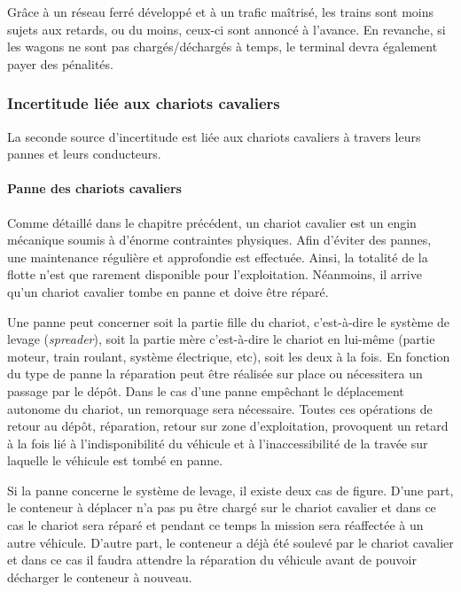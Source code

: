 Grâce à un réseau ferré développé et à un trafic maîtrisé, les trains sont moins sujets aux retards, ou du moins, ceux-ci sont annoncé à l'avance. En revanche, si les wagons ne sont pas chargés/déchargés à temps, le terminal devra également payer des pénalités.

\subsubsection{Incertitude liée aux chariots cavaliers}

La seconde source d'incertitude est liée aux chariots cavaliers à travers leurs pannes et leurs conducteurs.

\paragraph{Panne des chariots cavaliers}
Comme détaillé dans le chapitre précédent, un chariot cavalier est un engin mécanique soumis à d'énorme contraintes physiques. 
Afin d'éviter des pannes, une maintenance régulière et approfondie est effectuée. Ainsi, la totalité de la flotte n'est que rarement disponible pour l'exploitation. Néanmoins, il arrive qu'un chariot cavalier tombe en panne et doive être réparé.

Une panne peut concerner soit la partie fille du chariot, c'est-à-dire le système de levage (\textit{spreader}), soit la partie mère c'est-à-dire le chariot en lui-même (partie moteur, train roulant, système électrique, etc), soit les deux à la fois. 
En fonction du type de panne la réparation peut être réalisée sur place ou nécessitera un passage par le dépôt. 
Dans le cas d'une panne empêchant le déplacement autonome du chariot, un remorquage sera nécessaire. Toutes ces opérations de retour au dépôt, réparation, retour sur zone d'exploitation, provoquent un retard à la fois lié à l'indisponibilité du véhicule et à l'inaccessibilité de la travée sur laquelle le véhicule est tombé en panne.

Si la panne concerne le système de levage, il existe deux cas de figure. D'une part, le conteneur à déplacer n'a pas pu être chargé sur le chariot cavalier et dans ce cas le chariot sera réparé et pendant ce temps la mission sera réaffectée à un autre véhicule. D'autre part, le conteneur a déjà été soulevé par le chariot cavalier et dans ce cas il faudra attendre la réparation du véhicule avant de pouvoir décharger le conteneur à nouveau.

